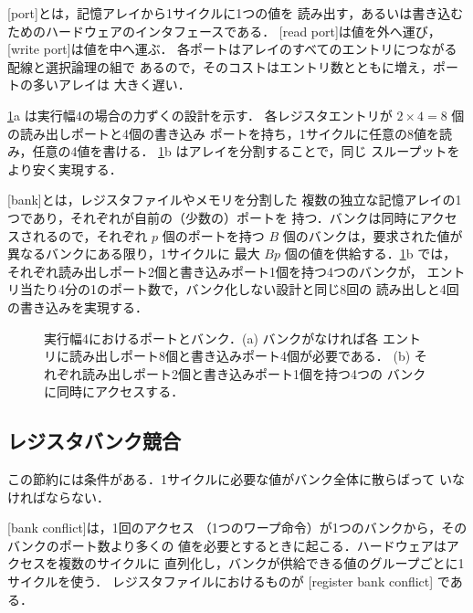 \documentclass[../main.tex]{subfiles}
\begin{document}
\begin{definition}[ポート]
  \label{def:l04-port}
  [port]とは，記憶アレイから1サイクルに1つの値を
  読み出す，あるいは書き込むためのハードウェアのインタフェースである．
  [read port]は値を外へ運び，
  [write port]は値を中へ運ぶ．
  各ポートはアレイのすべてのエントリにつながる配線と選択論理の組で
  あるので，そのコストはエントリ数とともに増え，ポートの多いアレイは
  大きく遅い．
\end{definition}

\cref{fig:l04-ports-vs-banks}a は実行幅4の場合の力ずくの設計を示す．
各レジスタエントリが $2 \times 4 = 8$ 個の読み出しポートと4個の書き込み
ポートを持ち，1サイクルに任意の8値を読み，任意の4値を書ける．
\cref{fig:l04-ports-vs-banks}b はアレイを分割することで，同じ
スループットをより安く実現する．

\begin{definition}[バンク]
  \label{def:l04-bank}
  [bank]とは，レジスタファイルやメモリを分割した
  複数の独立な記憶アレイの1つであり，それぞれが自前の（少数の）ポートを
  持つ．バンクは同時にアクセスされるので，それぞれ $p$ 個のポートを持つ
  $B$ 個のバンクは，要求された値が異なるバンクにある限り，1サイクルに
  最大 $Bp$ 個の値を供給する．\cref{fig:l04-ports-vs-banks}b では，
  それぞれ読み出しポート2個と書き込みポート1個を持つ4つのバンクが，
  エントリ当たり4分の1のポート数で，バンク化しない設計と同じ8回の
  読み出しと4回の書き込みを実現する．
\end{definition}

\begin{figure}[htbp]
  \centering
  
  \caption{実行幅4におけるポートとバンク．(a) バンクがなければ各
    エントリに読み出しポート8個と書き込みポート4個が必要である．
    (b) それぞれ読み出しポート2個と書き込みポート1個を持つ4つの
    バンクに同時にアクセスする．}
  \label{fig:l04-ports-vs-banks}
\end{figure}

\subsection{レジスタバンク競合}

この節約には条件がある．1サイクルに必要な値がバンク全体に散らばって
いなければならない．

\begin{definition}[バンク競合]
  \label{def:l04-bank-conflict}
  [bank conflict]は，1回のアクセス
  （1つのワープ命令）が1つのバンクから，そのバンクのポート数より多くの
  値を必要とするときに起こる．ハードウェアはアクセスを複数のサイクルに
  直列化し，バンクが供給できる値のグループごとに1サイクルを使う．
  レジスタファイルにおけるものが
  [register bank conflict]
  である．
\end{definition}
\end{document}
